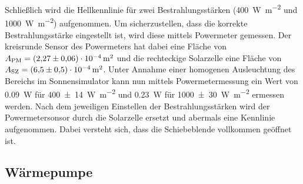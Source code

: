 \documentclass[english, ngerman]{scrartcl}
\begin{document}
Schließlich wird die Hellkennlinie für zwei Bestrahlungsstärken (\SI{400}{\watt\per\meter\squared} und \SI{1000}{\watt\per\meter\squared}) aufgenommen. Um sicherzustellen, dass die korrekte Bestrahlungsstärke eingestellt ist, wird diese mittels Powermeter gemessen. Der kreisrunde Sensor des Powermeters hat dabei eine Fläche von $A_{\text{PM}} = \SI{2.27(6)e-4}{m\squared}$ und die rechteckige Solarzelle eine Fläche von $A_{\text{SZ}} = \SI{6.5(5)e-4}{m\squared}$. Unter Annahme einer homogenen Ausleuchtung des Bereichs im Sonnensimulator kann nun mittels Powermetermessung ein Wert von \SI{0,09}{\watt} für \SI{400(14)}{\watt\per\meter\squared} und \SI{0,23}{\watt} für \SI{1000(30)}{\watt\per\meter\squared} ermessen werden. Nach dem jeweiligen Einstellen der Bestrahlungsstärken wird der Powermetersonsor durch die Solarzelle ersetzt und abermals eine Kennlinie aufgenommen. Dabei versteht sich, dass die Schiebeblende vollkommen geöffnet ist.


\subsection{Wärmepumpe}
\label{subsec:durchfuehrung_waermepumpe}
\end{document}
